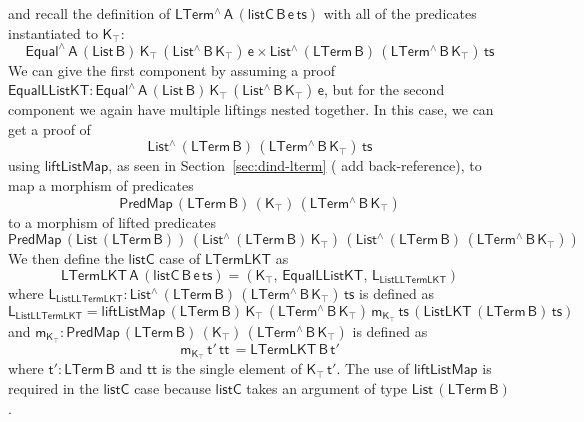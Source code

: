\documentclass[9pt]{entcs}
\begin{document}
\begin{itemize}
and recall the definition of $\mathsf{LTerm^{\wedge}\,A\,(listC\, B\, e\, ts)}$
with all of the predicates instantiated to $\mathsf{K_\top}$: 
\[
\mathsf{ Equal^{\wedge} \, A\, (List\,B)\, K_\top\, (List^{\wedge} \, B\, K_\top) \, e
      \times List^{\wedge}\, (LTerm\,B) \, (LTerm^{\wedge} \, B\, K_\top) \, ts }
\]
We can give the first component by assuming a proof \,
$\mathsf{EqualLListKT : Equal^{\wedge} \, A\, (List\,B)\, K_\top\, (List^{\wedge} \, B\, K_\top) \, e}$, 
but for the second component we again have multiple liftings nested together.
In this case, we can get a proof of
\[
\mathsf{ List^{\wedge}\, (LTerm\,B) \, (LTerm^{\wedge} \, B\, K_\top) \, ts }
\]
using $\mathsf{liftListMap}$, as seen in Section~\ref{sec:dind-lterm} {(\color{red} add back-reference)},
to map a morphism of predicates 
\[
  \mathsf{PredMap\, (LTerm\,B)\, (K_\top)\, (LTerm^{\wedge}\,B\,K_\top)}
\]
to a morphism of lifted predicates
\[
  \mathsf{PredMap\,(List\,(LTerm\,B)) \,(List^{\wedge}\,(LTerm\,B)\,K_\top) \, (List^{\wedge}\,(LTerm\,B)\, (LTerm^{\wedge}\,B\,K_\top))}
\]
We then define the $\mathsf{listC}$ case of $\mathsf{LTermLKT}$ as 
\[
  \mathsf{LTermLKT\,A\, (listC\, B\, e\, ts) =
    (K_\top , \, EqualLListKT , \,  L_{ListLLTermLKT} ) }
\]
where
$\mathsf{L_{ListLLTermLKT} : List^{\wedge}\, (LTerm\,B) \, (LTerm^{\wedge} \, B\, K_\top) \, ts}$
is defined as
\[
\mathsf{ 
  L_{ListLLTermLKT} =
  liftListMap \, (LTerm\,B) \, K_\top \, (LTerm^{\wedge}\, B\, K_\top) \, m_{K_\top} \, ts \, (ListLKT\, (LTerm\, B)\, ts)
}
\]
and $\mathsf{m_{K_\top} : PredMap\, (LTerm\,B) \, (K_\top)\, (LTerm^{\wedge}\,B\,K_\top)}$
is defined as
\[
  \mathsf{m_{K_\top} \, t'\, tt\, = LTermLKT\, B\, t'}
\]
where $\mathsf{t' : LTerm\,B}$ and $\mathsf{tt}$ is the single element of $\mathsf{K_\top\, t'}$. 
The use of $\mathsf{liftListMap}$ is required in the $\mathsf{listC}$ case because 
$\mathsf{listC}$ takes an argument of type $\mathsf{List\, (LTerm\, B)}$.
\end{itemize}
\end{document}
